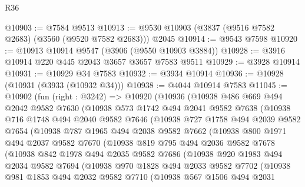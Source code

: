 \begin{lexlean}{R36}
\begin{coremodule}
@10903 := @7584 @9513
@10913 := @9530 @10903 (@3837 (@9516 @7582 @2683) (@3560 (@9520 @7582 @2683))) @2045
@10914 := @9543 @7598
@10920 := @10913 @10914 @9547 (@3906 (@9550 @10903 @3884))
@10928 := @3916 @10914 @220 @445 @2043 @3657 @3657 @7583 @9511
@10929 := @3928 @10914
@10931 := @10929 @34 @7583
@10932 := @3934 @10914
@10936 := @10928 (@10931 (@3933 (@10932 @34)))
@10938 := @4044 @10914 @7583
@11045 := @10902
    (fun (right : @3242) =>
    @10920
      (@10936
        (@10938
          @486
          @669
          @494
          @2042
          @9582
          @7630
          (@10938
            @573
            @1742
            @494
            @2041
            @9582
            @7638
            (@10938
              @716
              @1748
              @494
              @2040
              @9582
              @7646
              (@10938
                @727
                @1758
                @494
                @2039
                @9582
                @7654
                (@10938
                  @787
                  @1965
                  @494
                  @2038
                  @9582
                  @7662
                  (@10938
                    @800
                    @1971
                    @494
                    @2037
                    @9582
                    @7670
                    (@10938
                      @819
                      @795
                      @494
                      @2036
                      @9582
                      @7678
                      (@10938
                        @842
                        @1978
                        @494
                        @2035
                        @9582
                        @7686
                        (@10938
                          @920
                          @1983
                          @494
                          @2034
                          @9582
                          @7694
                          (@10938
                            @970
                            @1828
                            @494
                            @2033
                            @9582
                            @7702
                            (@10938
                              @981
                              @1853
                              @494
                              @2032
                              @9582
                              @7710
                              (@10938
                                @567
                                @1506
                                @494
                                @2031

\end{coremodule}
\end{lexlean}
